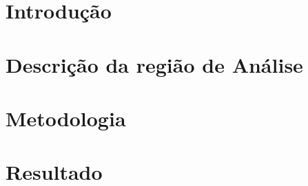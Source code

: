 \documentclass[12pt,a4paper]{article}
\begin{document}
    
	\newpage
    
    \newpage
    \tableofcontents    
    \newpage
    \section{Introdução}
    
    \section{Descrição da região de Análise}
      
    \section{Metodologia}
    
    \section{Resultado}
    
    
\end{document}
